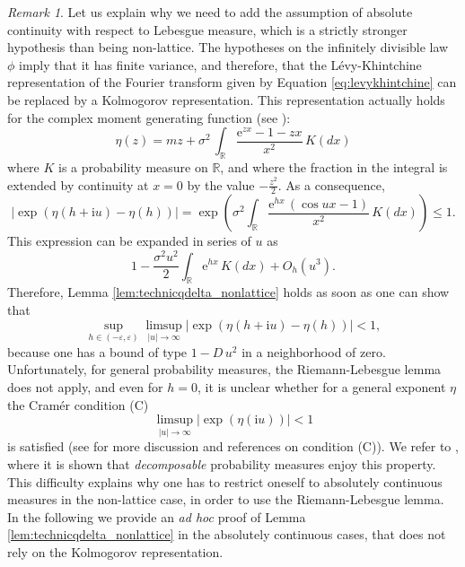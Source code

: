 \documentclass[12pt,a4paper,reqno]{amsart}
\theoremstyle{remark}
\newtheorem{remark}[lemma]{Remark}
\newcommand{\R}{\mathbb{R}}
\newcommand{\E}{\mathrm{e}}
\newcommand{\I}{\mathrm{i}}
\newcommand{\eps}{\varepsilon}
\renewcommand{\footnote}[1]{}
\begin{document}
\begin{remark} Let us explain why we need to add the assumption of absolute continuity with respect to Lebesgue measure, which is a strictly stronger hypothesis than being non-lattice. The hypotheses on the infinitely divisible law $\phi$ imply that it has finite variance, and therefore, that the L\'evy-Khintchine representation of the Fourier transform given by Equation \eqref{eq:levykhintchine} can be replaced by a Kolmogorov representation. This representation actually holds for the complex moment generating function (see \cite[Chapter 4, Theorem 7.7]{SVH04}):
$$\eta(z)=m z + \sigma^2\,\int_{\R}\frac{\E^{zx}-1-zx}{x^2}\,K(dx)$$
where $K$ is a probability measure on $\R$, and where the fraction in the integral is extended by continuity at $x=0$ by the value $-\frac{z^2}{2}$. As a consequence,
$$|\exp(\eta(h+\I u)-\eta(h))| = \exp\left(\sigma^2\int_{\R} \frac{\E^{hx}\,(\cos ux-1)}{x^2}\,K(dx)\right)\leq 1.$$
This expression can be expanded in series of $u$ as
$$1-\frac{\sigma^2u^2}{2} \int_{\R} \E^{hx} \,K(dx) + O_h(u^3).$$
Therefore, Lemma \ref{lem:technicqdelta_nonlattice} holds as soon as one can show that 
$$\sup_{h \in (-\eps,\eps)} \limsup_{|u| \to \infty} |\exp(\eta(h+\I u)-\eta(h))| <1,$$
because one has a bound of type $1-D\,u^2$ in a neighborhood of zero. Unfortunately, for general probability measures, the Riemann-Lebesgue lemma does not apply, and even for $h=0$, it is unclear whether for a general exponent $\eta$ the Cram\'er condition (C)
$$\limsup_{|u| \to \infty} |\exp(\eta(\I u))| <1 $$is satisfied (see \cite{Petrov95} for more discussion and references on  condition (C)).
We refer to \cite[Theorem 2]{Wol83}, where it is shown that \emph{decomposable} probability measures enjoy this property. This difficulty explains why one has to restrict oneself to absolutely continuous measures in the non-lattice case, in order to use the Riemann-Lebesgue lemma. In the following we provide an \emph{ad hoc} proof of Lemma \ref{lem:technicqdelta_nonlattice} in the absolutely continuous cases, that does not rely on the Kolmogorov representation.\footnote{V: Je ne comprends pas bien cette remarque. C'est une preuve alternative avec des hypothèses plus faibles ?
Si oui, pourquoi ne pas présenter celle-là, plutôt que l'autre\dots

PL: On pourrait effectivement donner des conditions plus faibles qu'absolument continu par rapport à la mesure de Lebesgue, mais ca deviendrait excessivement technique, et nettement plus dur. Dans l'article, j'ai l'impression qu'on essaie de se passer des résultats avancés sur les lois infiniment divisibles (on a juste besoin de la distinction lattice/non-lattice), c'est pour cela que je ne voulais pas plus entrer dans des details techniques.}
\end{remark} 
\end{document}

